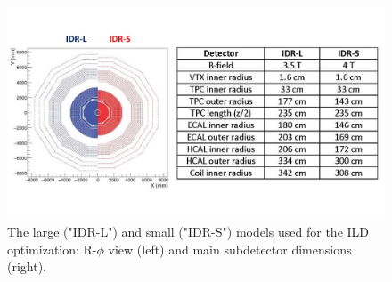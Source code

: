 \begin{figure}[t!]
\centering
\includegraphics[width=1.0\hsize]{ILD/fig/ILD_small-large.jpg}
\caption{The large ("IDR-L") and small ("IDR-S") models used for the ILD optimization: R-$\phi$ view (left) and main subdetector dimensions (right).}
\label{fig:ILD:sizes}
\end{figure}
	